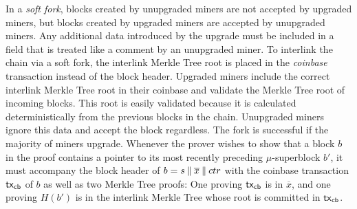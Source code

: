 In a \emph{soft fork}, blocks created by unupgraded miners are not accepted by
upgraded miners, but blocks created by upgraded miners are accepted by
unupgraded miners. Any additional data introduced by the upgrade must
be included in a field that is treated like a comment by an unupgraded miner.
To interlink the chain via a soft fork, the interlink Merkle Tree root is
placed in the \emph{coinbase} transaction instead of the block header. Upgraded
miners include the correct interlink Merkle Tree root in their coinbase and validate
the Merkle Tree root of incoming blocks.
This root is easily validated because it is
calculated deterministically from the previous blocks in the chain.
Unupgraded miners ignore this data and accept the block
regardless. The fork is successful if the majority of miners upgrade.
Whenever the prover wishes to show that a
block $b$ in the proof contains a pointer to its most recently preceding
$\mu$-superblock $b'$, it must accompany the block header of $b = s \mathbin{\|}
\overline{x} \mathbin{\|} ctr$ with the coinbase transaction $\mathsf{tx}_{\mathsf{cb}}$ of $b$ as well
as two Merkle Tree proofs: One proving $\mathsf{tx}_{\mathsf{cb}}$
is in $\overline{x}$, and one proving $H(b')$ is in the interlink
Merkle Tree whose root is committed in $\mathsf{tx}_{\mathsf{cb}}$.
